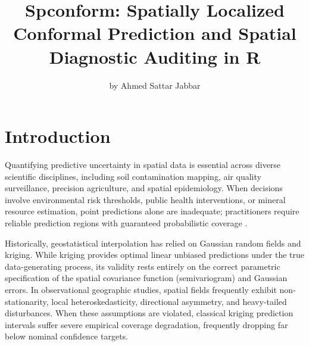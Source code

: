 \title{Spconform: Spatially Localized Conformal Prediction and Spatial Diagnostic Auditing in R}


\author{by Ahmed Sattar Jabbar}

\maketitle


\section{Introduction}\label{introduction}

Quantifying predictive uncertainty in spatial data is essential across diverse scientific disciplines, including soil contamination mapping, air quality surveillance, precision agriculture, and spatial epidemiology. When decisions involve environmental risk thresholds, public health interventions, or mineral resource estimation, point predictions alone are inadequate; practitioners require reliable prediction regions with guaranteed probabilistic coverage \citep{cressie1993statistics, bivand2013applied}.

Historically, geostatistical interpolation has relied on Gaussian random fields and kriging. While kriging provides optimal linear unbiased predictions under the true data-generating process, its validity rests entirely on the correct parametric specification of the spatial covariance function (semivariogram) and Gaussian errors. In observational geographic studies, spatial fields frequently exhibit non-stationarity, local heteroskedasticity, directional asymmetry, and heavy-tailed disturbances. When these assumptions are violated, classical kriging prediction intervals suffer severe empirical coverage degradation, frequently dropping far below nominal confidence targets.

